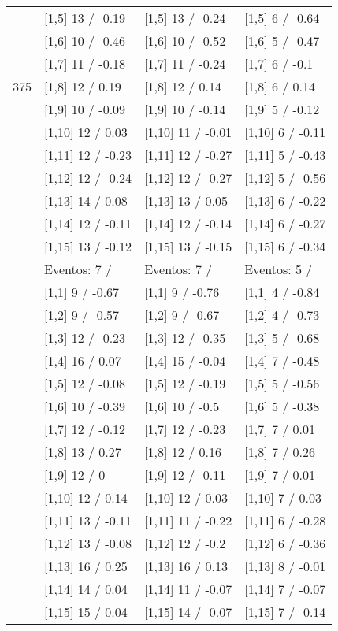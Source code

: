 \begin{table}
\begin{tabular}[t]{llll}
 & {}[1,5] 13  / -0.19 & {}[1,5] 13  / -0.24 & {}[1,5] 6  / -0.64\\
 & {}[1,6] 10  / -0.46 & {}[1,6] 10  / -0.52 & {}[1,6] 5  / -0.47\\
 & {}[1,7] 11  / -0.18 & {}[1,7] 11  / -0.24 & {}[1,7] 6  / -0.1\\
375 & {}[1,8] 12  / 0.19 & {}[1,8] 12  / 0.14 & {}[1,8] 6  / 0.14\\
\addlinespace
 & {}[1,9] 10  / -0.09 & {}[1,9] 10  / -0.14 & {}[1,9] 5  / -0.12\\
 & {}[1,10] 12  / 0.03 & {}[1,10] 11  / -0.01 & {}[1,10] 6  / -0.11\\
 & {}[1,11] 12  / -0.23 & {}[1,11] 12  / -0.27 & {}[1,11] 5  / -0.43\\
 & {}[1,12] 12  / -0.24 & {}[1,12] 12  / -0.27 & {}[1,12] 5  / -0.56\\
 & {}[1,13] 14  / 0.08 & {}[1,13] 13  / 0.05 & {}[1,13] 6  / -0.22\\
\addlinespace
 & {}[1,14] 12  / -0.11 & {}[1,14] 12  / -0.14 & {}[1,14] 6  / -0.27\\
 & {}[1,15] 13  / -0.12 & {}[1,15] 13  / -0.15 & {}[1,15] 6  / -0.34\\
 & Eventos:  7 / & Eventos:  7 / & Eventos:  5 /\\
 & {}[1,1] 9  / -0.67 & {}[1,1] 9  / -0.76 & {}[1,1] 4  / -0.84\\
 & {}[1,2] 9  / -0.57 & {}[1,2] 9  / -0.67 & {}[1,2] 4  / -0.73\\
\addlinespace
 & {}[1,3] 12  / -0.23 & {}[1,3] 12  / -0.35 & {}[1,3] 5  / -0.68\\
 & {}[1,4] 16  / 0.07 & {}[1,4] 15  / -0.04 & {}[1,4] 7  / -0.48\\
 & {}[1,5] 12  / -0.08 & {}[1,5] 12  / -0.19 & {}[1,5] 5  / -0.56\\
 & {}[1,6] 10  / -0.39 & {}[1,6] 10  / -0.5 & {}[1,6] 5  / -0.38\\
 & {}[1,7] 12  / -0.12 & {}[1,7] 12  / -0.23 & {}[1,7] 7  / 0.01\\
\addlinespace
500 & {}[1,8] 13  / 0.27 & {}[1,8] 12  / 0.16 & {}[1,8] 7  / 0.26\\
 & {}[1,9] 12  / 0 & {}[1,9] 12  / -0.11 & {}[1,9] 7  / 0.01\\
 & {}[1,10] 12  / 0.14 & {}[1,10] 12  / 0.03 & {}[1,10] 7  / 0.03\\
 & {}[1,11] 13  / -0.11 & {}[1,11] 11  / -0.22 & {}[1,11] 6  / -0.28\\
 & {}[1,12] 13  / -0.08 & {}[1,12] 12  / -0.2 & {}[1,12] 6  / -0.36\\
\addlinespace
 & {}[1,13] 16  / 0.25 & {}[1,13] 16  / 0.13 & {}[1,13] 8  / -0.01\\
 & {}[1,14] 14  / 0.04 & {}[1,14] 11  / -0.07 & {}[1,14] 7  / -0.07\\
 & {}[1,15] 15  / 0.04 & {}[1,15] 14  / -0.07 & {}[1,15] 7  / -0.14\\
\bottomrule
\end{tabular}
\end{table}
